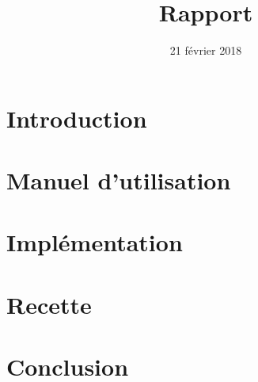 \documentclass[12pt]{article}
\title{Rapport}
\date{21 février 2018}
\begin{document}
\maketitle
\renewcommand{\contentsname}{Sommaire}
\tableofcontents
\newpage
\section{Introduction}
	 

\newpage
\section{Manuel d'utilisation}

\section{Implémentation}

\section{Recette}
		
\section{Conclusion}
\end{document}
